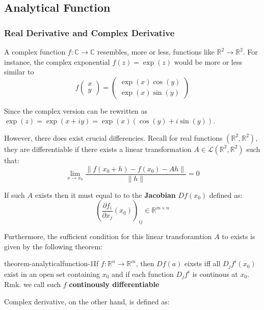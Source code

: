 \subsection{Analytical Function}

\subsubsection{Real Derivative and Complex Derivative}

A complex function $f:\mathbb{C}\to \mathbb{C}$ resembles, more or less, functions like $\mathbb{R}^2\to \mathbb{R}^2$. For instance, the complex exponential $f(z)=\exp(z)$ would be more or less similar to
\begin{equation}
f\begin{pmatrix}
        x \\
        y
    \end{pmatrix} = 
    \begin{pmatrix}
        \exp(x)\cos(y) \\
        \exp(x)\sin(y)
    \end{pmatrix}
\end{equation}

Since the complex version can be rewritten as $\exp(z)=\exp(x+iy)=\exp(x)(\cos(y) + i\sin(y))$.

However, there does exist crucial differencies. Recall for real functions $(\mathbb{R}^2, \mathbb{R}^2)$, they are differentiable if there exists a linear transformation $A\in \mathcal L (\mathbb{R}^2, \mathbb{R}^2)$ such that:
\begin{equation}
\lim_{x\to x_0} \frac{\|f(x_0+h)-f(x_0) - Ah\|}{\|h\|}=0
\end{equation}

If such $A$ exists then it must equal to to the \textbf{Jacobian} $Df(x_0)$ defined as:
\begin{equation}
\left(\frac{\partial f_i}{\partial x_j}(x_0)\right)_{ij} \in \mathbb{R}^{m\times n}
\end{equation}

Furthermore, the sufficient condition for this linear transforamtion $A$ to exists is given by the following theorem:

\begin{mystthmtheorem}{}{theorem-analyticalfunction-1}If $f:\mathbb{R}^n\to \mathbb{R}^m$, then $Df(a)$ eixsts iff all $D_jf^{i}(x_0)$ exist in an open set containing $x_0$ and if each function $D_jf^i$ is continous at $x_0$.
Rmk. we call such $f$ \textbf{continously differentiable}

\end{mystthmtheorem}
Complex derivative, on the other hand, is defined as:

